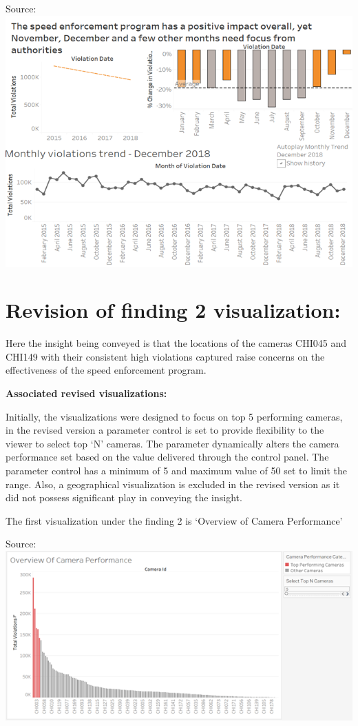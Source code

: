 \documentclass[]{book}
\begin{document}
Source:\citep{revised}
\includegraphics{images/Rev_img4.png}

\hypertarget{revision-of-finding-2-visualization}{%
\section{Revision of finding 2 visualization:}\label{revision-of-finding-2-visualization}}

Here the insight being conveyed is that the locations of the cameras CHI045 and CHI149 with their consistent high violations captured raise concerns on the effectiveness of the speed enforcement program.

\textbf{Associated revised visualizations:}

Initially, the visualizations were designed to focus on top 5 performing cameras, in the revised version a parameter control is set to provide flexibility to the viewer to select top `N' cameras. The parameter dynamically alters the camera performance set based on the value delivered through the control panel. The parameter control has a minimum of 5 and maximum value of 50 set to limit the range. Also, a geographical visualization is excluded in the revised version as it did not possess significant play in conveying the insight.

The first visualization under the finding 2 is `Overview of Camera Performance'

Source:\citep{revised}
\includegraphics{images/Rev_img5.png}
\end{document}
